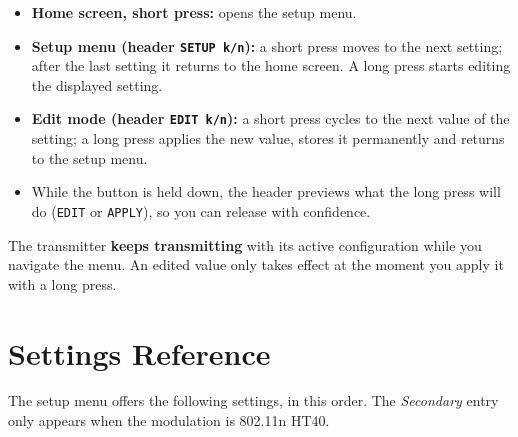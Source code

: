 \documentclass[a5paper, 10pt, twoside]{article}
\begin{document}
\begin{itemize}[leftmargin=1.5em, itemsep=2pt, topsep=2pt]
  \item \textbf{Home screen, short press:} opens the setup menu.
  \item \textbf{Setup menu (header \texttt{SETUP k/n}):} a short press moves
        to the next setting; after the last setting it returns to the home
        screen. A long press starts editing the displayed setting.
  \item \textbf{Edit mode (header \texttt{EDIT k/n}):} a short press cycles
        to the next value of the setting; a long press applies the new value,
        stores it permanently and returns to the setup menu.
  \item While the button is held down, the header previews what the long
        press will do (\texttt{EDIT} or \texttt{APPLY}), so you can release
        with confidence.
\end{itemize}

\begin{notebox}
The transmitter \textbf{keeps transmitting} with its active configuration
while you navigate the menu. An edited value only takes effect at the moment
you apply it with a long press.
\end{notebox}

\clearpage
\section{Settings Reference}
\label{sec:settings}

The setup menu offers the following settings, in this order. The
\emph{Secondary} entry only appears when the modulation is 802.11n HT40.
\end{document}
